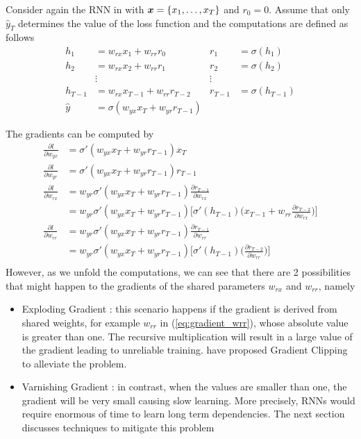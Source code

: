 Consider again the RNN in \addfigure{\ref{fig:rnn_unfold}} with $\boldsymbol{x} = \{x_1, \dots, x_T \}$ and $r_0 = 0$. Assume that only $\hat{y}_T$ determines the value of the loss function and the computations are defined as follows 
\begin{align}
	h_1 &= w_{rx} x_1 + w_{rr} r_0 & r_1 &= \sigma(h_1) \label{eq:naive_r} \\
	h_2 &= w_{rx} x_2 + w_{rr} r_1 &  r_2 &= \sigma(h_2) \\
	& \vdots & \vdots \\
	h_{T-1} &= w_{rx} x_{T-1} + w_{rr} r_{T-2} &  r_{T-1} &= \sigma(h_{T-1}) \\
	\hat{y} &= \sigma(w_{yx} x_T   + w_{yr} r_{T-1})
\end{align}

The gradients can be computed by 
\begin{align}
	\frac{\partial l}{\partial w_{yx}} &= \sigma'(w_{yx} x_T   + w_{yr} r_{T-1}) x_T \\
	\frac{\partial l}{\partial w_{yr}} &= \sigma'(w_{yx} x_T   + w_{yr} r_{T-1}) r_{T-1} \\
	\frac{\partial l}{\partial w_{rx}} &= 	w_{yr} \sigma'(w_{yx} x_T   + w_{yr} r_{T-1}) \frac{\partial r_{T-1}}{\partial w_{rx}} \\
	&= w_{yr} \sigma'(w_{yx} x_T   + w_{yr} r_{T-1})  \Bigg[ \sigma'(h_{T-1}) \bigg( x_{T-1} + w_{rr}  \frac{\partial r_{T-2}}{\partial w_{rx}} \bigg) \Bigg]  \label{eq:gradient_wrr}  \\
	\frac{\partial l}{\partial w_{rr}} &= w_{yr} \sigma'(w_{yx} x_T   + w_{yr} r_{T-1})  \frac{\partial r_{T-1}}{\partial w_{rr}}  \\
	&= w_{yr} \sigma'(w_{yx} x_T   + w_{yr} r_{T-1})  \Bigg[ \sigma'(h_{T-1}) \bigg( \frac{\partial r_{T-2}}{\partial w_{rr}} \bigg) \Bigg] \\
\end{align}
However, as we unfold the computations, we can see that there are 2 possibilities that might happen to the gradients of the shared parameters $w_{rx}$ and $ w_{rr}$, namely
\begin{itemize}
	\item Exploding Gradient : this scenario happens if the gradient is derived from shared weights, for example $w_{rr}$ in  (\ref{eq:gradient_wrr}), whose absolute value is greater than one. The recursive multiplication will result in a large value of the gradient leading to unreliable training. \cite{PascanuUnderstandingexplodinggradient2012} have proposed Gradient Clipping to alleviate the problem.
	\item Varnishing Gradient : in contrast, when the values are smaller than one, the gradient will be very small causing slow learning. More precisely, RNNs would require enormous of time to learn long term dependencies. The next section discusses techniques to mitigate this problem
\end{itemize}


